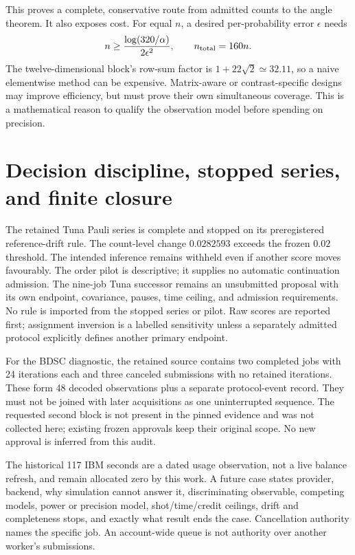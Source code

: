 \documentclass[11pt,a4paper]{article}
\begin{document}
This proves a complete, conservative route from admitted counts to the angle theorem. It also exposes cost. For equal $n$, a desired per-probability error $\epsilon$ needs
\begin{equation}
n\ge\frac{\log(320/\alpha)}{2\epsilon^2},\qquad n_{\rm total}=160n.
\end{equation}
The twelve-dimensional block's row-sum factor is $1+22\sqrt2\simeq32.11$, so a naive elementwise method can be expensive. Matrix-aware or contrast-specific designs may improve efficiency, but must prove their own simultaneous coverage. This is a mathematical reason to qualify the observation model before spending on precision.

\section{Decision discipline, stopped series, and finite closure}
The retained Tuna Pauli series is complete and stopped on its preregistered reference-drift rule. The count-level change $0.0282593$ exceeds the frozen $0.02$ threshold. The intended inference remains withheld even if another score moves favourably. The order pilot is descriptive; it supplies no automatic continuation admission. The nine-job Tuna successor remains an unsubmitted proposal with its own endpoint, covariance, pauses, time ceiling, and admission requirements. No rule is imported from the stopped series or pilot. Raw scores are reported first; assignment inversion is a labelled sensitivity unless a separately admitted protocol explicitly defines another primary endpoint.

For the BDSC diagnostic, the retained source contains two completed jobs with 24 iterations each and three canceled submissions with no retained iterations. These form 48 decoded observations plus a separate protocol-event record. They must not be joined with later acquisitions as one uninterrupted sequence. The requested second block is not present in the pinned evidence and was not collected here; existing frozen approvals keep their original scope. No new approval is inferred from this audit.

The historical 117 IBM seconds are a dated usage observation, not a live balance refresh, and remain allocated zero by this work. A future case states provider, backend, why simulation cannot answer it, discriminating observable, competing models, power or precision model, shot/time/credit ceilings, drift and completeness stops, and exactly what result ends the case. Cancellation authority names the specific job. An account-wide queue is not authority over another worker's submissions.
\end{document}
